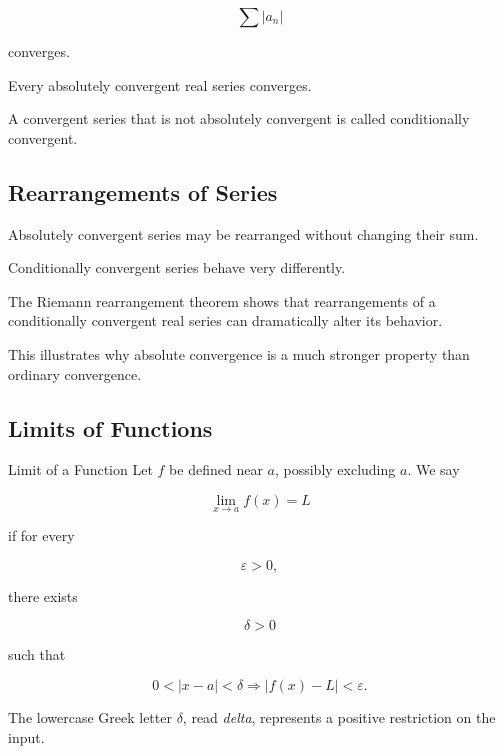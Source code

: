 \[
\boxed{
\sum |a_n|
}
\]

converges.

\begin{theorem}
Every absolutely convergent real series converges.
\end{theorem}

A convergent series that is not absolutely convergent is called
conditionally convergent.

\subsection{Rearrangements of Series}
\label{subsec:rearrangements-series}

Absolutely convergent series may be rearranged without changing their sum.

Conditionally convergent series behave very differently.

The Riemann rearrangement theorem shows that rearrangements of a
conditionally convergent real series can dramatically alter its behavior.

This illustrates why absolute convergence is a much stronger property than
ordinary convergence.

\subsection{Limits of Functions}
\label{subsec:function-limits-rigorous}

\begin{definitionbox}{Limit of a Function}
Let \(f\) be defined near \(a\), possibly excluding \(a\). We say

\[
\lim_{x\to a}f(x)=L
\]

if for every

\[
\varepsilon>0,
\]

there exists

\[
\delta>0
\]

such that

\[
\boxed{
0<|x-a|<\delta
\Longrightarrow
|f(x)-L|<\varepsilon.
}
\]

The lowercase Greek letter \(\delta\), read \emph{delta}, represents a
positive restriction on the input.
\end{definitionbox}

